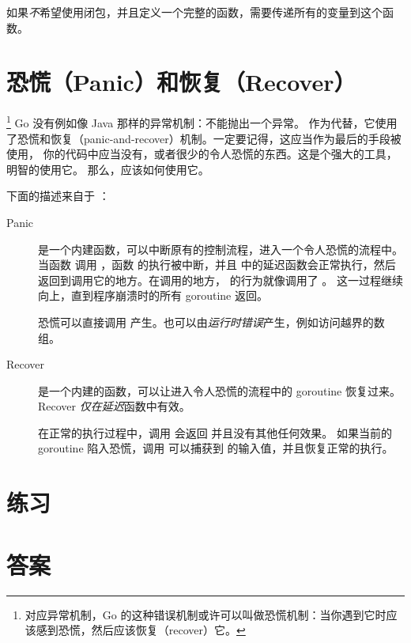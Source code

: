 如果\emph{不}希望使用闭包，并且定义一个完整的函数，需要传递所有的变量到这个函数。



\section{恐慌（Panic）和恢复（Recover）}
\label{sec:panic}
\footnote{对应异常机制，Go 的这种错误机制或许可以叫做恐慌机制：当你遇到它时应该感到恐慌，然后应该恢复（recover）它。}
Go 没有例如像 Java 那样的异常机制：不能抛出一个异常。
作为代替，它使用了恐慌和恢复（panic-and-recover）机制。一定要记得，这应当作为最后的手段被使用，
你的代码中应当没有，或者很少的令人恐慌的东西。这是个强大的工具，明智的使用它。
那么，应该如何使用它。

下面的描述来自于 \cite{go_blog_panic}：
\begin{description}
\item[Panic]{是一个内建函数，可以中断原有的控制流程，进入一个令人恐慌的流程中。
当函数  调用 ，函数  的执行被中断，并且  中的延迟函数会正常执行，然后
 返回到调用它的地方。在调用的地方， 的行为就像调用了 。
这一过程继续向上，直到程序崩溃时的所有 goroutine 返回。

恐慌可以直接调用  产生。也可以由\emph{运行时错误}产生，例如访问越界的数组。}

\item[Recover]{是一个内建的函数，可以让进入令人恐慌的流程中的 goroutine 恢复过来。
Recover \emph{仅在}\emph{延迟}函数中有效。

在正常的执行过程中，调用  会返回  并且没有其他任何效果。
如果当前的 goroutine 陷入恐慌，调用  可以捕获到  的输入值，并且恢复正常的执行。}
\end{description}

\section{练习}




















\cleardoublepage
\section{答案}
\shipoutAnswer
